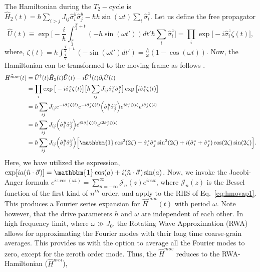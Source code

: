 \documentclass[
nofootinbib,
reprint,
superscriptaddress,
amsmath,amssymb,showkeys,
aps,
prb,
]{revtex4-2}
\begin{document}
	The Hamiltonian during the $T_2-$cycle is $\displaystyle \hat{H}_2(t) = \hbar\sum_{i>j} J_{ij}\hat{\sigma}^y_i\hat{\sigma}^y_j - \hbar h \sin(\omega t) \sum_i \hat{\sigma}^z_i$. Let us define the free propagator 
	\begin{equation}
		\hat{U}(t) \equiv \exp \bigg[-\frac{i}{\hbar}\int_{\frac{T}{2}}^{\frac{T}{2}+t} (-h \sin(\omega t'))dt' \hbar\sum_i\hat{\sigma}^z_i\bigg]
		=\prod_{i} \exp\big[-i \hat{\sigma}^z_i\zeta(t)\big],
	\end{equation}
	where, $\displaystyle \zeta (t) = h\int_{\frac{T}{2}}^{\frac{T}{2}+t}  (-\sin(\omega t')dt') =\frac{h}{\omega}(1-\cos(\omega t))$.
	Now, the Hamiltonian can be transformed to the moving frame as follows \cite{haldar_statistical_2022}.
	\begin{align}
		\hat{H^{mov}}(t) &= \hat{U}^\dagger(t) \hat{H}_2(t) \hat{U}(t)- i \hat{U}^\dagger(t) \partial_t \hat{U}(t) \nonumber\\
		&= \prod_{i} \exp\big[-i\hat{\sigma}^z_i \zeta(t)\big] \big[\hbar\sum_{ij}J_{ij}\hat{\sigma}^y_i\hat{\sigma}^y_j\big] \exp\big[ i\hat{\sigma}^z_i \zeta(t)\big]\nonumber\\
		&= \hbar\sum_{ij} J_{ij} e^{-i\hat{\sigma}^z_i \zeta(t)} e^{-i\hat{\sigma}^z_j  \zeta(t)}\Big(\hat{\sigma}^y_i\hat{\sigma}^y_j\Big)e^{i\hat{\sigma}^z_i \zeta(t)} e^{i\hat{\sigma}^z_j \zeta(t)}\nonumber\\
		&= \hbar\sum_{ij} J_{ij} \Big(\hat{\sigma}^y_i\hat{\sigma}^y_j\Big)e^{i2\hat{\sigma}^z_i \zeta(t)} e^{i2\hat{\sigma}^z_j \zeta(t)}\nonumber\\
		&= \hbar\sum_{ij} J_{ij} \Big(\hat{\sigma}^y_i\hat{\sigma}^y_j\Big) \Big[\mathbbm{1}\cos^2(2\zeta) -\hat{\sigma}^z_i\hat{\sigma}^z_j \sin^2(2\zeta) + i (\hat{\sigma}^z_i + \hat{\sigma}^z_j)\cos(2\zeta)\sin(2\zeta)\Big].
		\label{eq:hmovap1}
	\end{align}
	Here, we have utilized the expression, $\displaystyle \exp[ia(\hat{n}\cdot\vec{\sigma})] = \mathbbm{1} \cos(a) + i (\hat{n}\cdot\vec{\sigma})\sin(a)$.	Now, we invoke the Jacobi-Anger formula $\displaystyle e^{iz\cos(\omega t)} = \sum_{n=-\infty}^{\infty}\mathcal{J}_n(z)e^{in\omega t}$\cite{arfkenmath}, where $\mathcal{J}_n(z)$ is the Bessel function of the first kind of $n^{th}$ order, and apply to the RHS of  Eq.~\ref{eq:hmovap1}. This produces a Fourier series expansion for 
	$\hat{H}^{mov}(t)$ with period $\omega$. Note however, that the drive parameters $h$ and $\omega$ are independent of each other. In high frequency limit, where $\omega \gg J_0$, the Rotating Wave Approximation (RWA) allows for approximating the Fourier modes with their long time coarse-grain averages. This provides us with the option to average all the Fourier modes to zero, except for the zeroth order mode. Thus, the $\hat{H}^{mov}$ reduces to the RWA-Hamiltonian ($\hat{H}^{_{RWA}}$),
\end{document}
